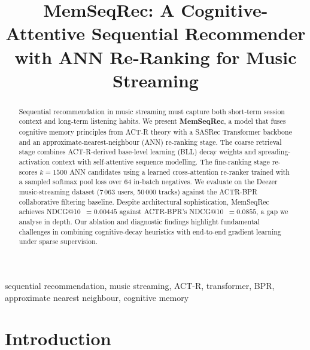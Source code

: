 \documentclass[conference]{IEEEtran}
\begin{document}
\title{MemSeqRec: A Cognitive-Attentive Sequential Recommender\\
with ANN Re-Ranking for Music Streaming}

\author{
}

\maketitle

\begin{abstract}
Sequential recommendation in music streaming must capture both
short-term session context and long-term listening habits.
We present \textbf{MemSeqRec}, a model that fuses cognitive
memory principles from ACT-R theory with a SASRec Transformer
backbone and an approximate-nearest-neighbour (ANN) re-ranking
stage.
The coarse retrieval stage combines ACT-R-derived base-level
learning (BLL) decay weights and spreading-activation context
with self-attentive sequence modelling.
The fine-ranking stage re-scores $k{=}1500$ ANN candidates using a
learned cross-attention re-ranker trained with a sampled softmax
pool loss over 64 in-batch negatives.
We evaluate on the Deezer music-streaming dataset
(7\,063 users, 50\,000 tracks) against the ACTR-BPR collaborative
filtering baseline.
Despite architectural sophistication, MemSeqRec achieves
NDCG@10~$=0.00445$ against ACTR-BPR's NDCG@10~$=0.0855$,
a gap we analyse in depth.
Our ablation and diagnostic findings highlight fundamental
challenges in combining cognitive-decay heuristics with
end-to-end gradient learning under sparse supervision.
\end{abstract}

\begin{IEEEkeywords}
sequential recommendation, music streaming, ACT-R, transformer,
BPR, approximate nearest neighbour, cognitive memory
\end{IEEEkeywords}

\section{Introduction}
\end{document}
